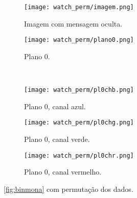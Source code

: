\begin{figure}[H]
    \centering
    \begin{subfigure}{0.4\textwidth}
        \centering
        \texttt{[image: watch\_perm/imagem.png]}
        \caption{Imagem com mensagem oculta.}
        \label{fig:permbin:imagem}
    \end{subfigure}%
    \begin{subfigure}{0.4\textwidth}
        \centering
        \texttt{[image: watch\_perm/plano0.png]}
        \caption{Plano 0.}
        \label{fig:permbin:plano}
    \end{subfigure}\\[8pt]
    \begin{subfigure}{0.28\textwidth}
        \centering
        \texttt{[image: watch\_perm/pl0chb.png]}
        \caption{Plano 0, canal azul.}
        \label{fig:permbin:blue}
    \end{subfigure}%
    \begin{subfigure}{0.28\textwidth}
        \centering
        \texttt{[image: watch\_perm/pl0chg.png]}
        \caption{Plano 0, canal verde.}
        \label{fig:permbin:green}
    \end{subfigure}%
    \begin{subfigure}{0.28\textwidth}
        \centering
        \texttt{[image: watch\_perm/pl0chr.png]}
        \caption{Plano 0, canal vermelho.}
        \label{fig:permbin:red}
    \end{subfigure}%

    \caption{\cref{fig:binmona} com permutação dos dados.}
    \label{fig:permbin}
\end{figure}